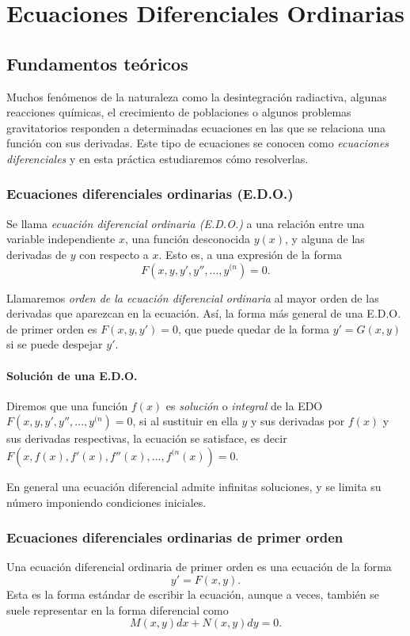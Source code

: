 \chapter{Ecuaciones Diferenciales Ordinarias}

\section{Fundamentos teóricos}

Muchos fenómenos de la naturaleza como la desintegración radiactiva, algunas reacciones químicas, el crecimiento de
poblaciones o algunos problemas gravitatorios responden a determinadas ecuaciones en las que se relaciona una función
con sus derivadas. 
Este tipo de ecuaciones se conocen como \emph{ecuaciones diferenciales} y en esta práctica
estudiaremos cómo resolverlas.

\subsection{Ecuaciones diferenciales ordinarias (E.D.O.)}
Se llama \emph{ecuación diferencial ordinaria (E.D.O.)} a una relación entre una variable independiente $x$, una función
desconocida $y(x)$, y alguna de las derivadas de $y$ con respecto a $x$. 
Esto es, a una expresión de la forma
\[
F(x,y,y',y'',...,y^{(n})=0.
\]

Llamaremos \emph{orden de la ecuación diferencial ordinaria} al mayor orden de las derivadas que aparezcan en la
ecuación. 
Así, la forma más general de una E.D.O. de primer orden es $F(x,y,y')=0$, que puede quedar de la forma $y'=G(x,y)$ si se
puede despejar $y'$.

\subsubsection*{Solución de una E.D.O.}
Diremos que una función $f(x)$ es \emph{solución} o \emph{integral} de la EDO $F(x,y,y',y'',...,y^{(n})=0$, si al
sustituir en ella $y$ y sus derivadas por $f(x)$ y sus derivadas respectivas, la ecuación se satisface, es decir
$F(x,f(x),f'(x),f''(x),...,f^{(n}(x))=0$.

En general una ecuación diferencial admite infinitas soluciones, y se limita su número imponiendo condiciones iniciales.

\subsection{Ecuaciones diferenciales ordinarias de primer orden}
Una ecuación diferencial ordinaria de primer orden es una ecuación de la forma
\[
y'=F(x,y).
\]
Esta es la forma estándar de escribir la ecuación, aunque a veces, también se suele representar en la forma diferencial como
\[
M(x,y)dx+N(x,y)dy=0.
\]

